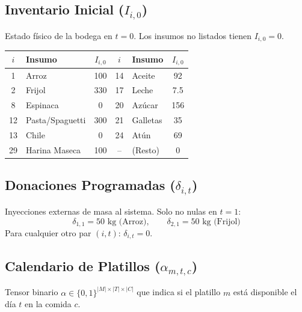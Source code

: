 \documentclass[12pt, letterpaper]{article}
\begin{document}
\subsection{Inventario Inicial ($I_{i,0}$)}

Estado físico de la bodega en $t = 0$. Los insumos no listados tienen $I_{i,0} = 0$.

\begin{table}[h!]
\centering
\begin{tabular}{clc|clc}
\toprule
$i$ & \textbf{Insumo} & $I_{i,0}$ & $i$ & \textbf{Insumo} & $I_{i,0}$ \\
\midrule
1  & Arroz            & 100  & 14 & Aceite   & 92   \\
2  & Frijol           & 330  & 17 & Leche    & 7.5  \\
8  & Espinaca         & 0    & 20 & Azúcar   & 156  \\
12 & Pasta/Spaguetti  & 300  & 21 & Galletas & 35   \\
13 & Chile            & 0    & 24 & Atún     & 69   \\
29 & Harina Maseca    & 100  & -- & (Resto)  & 0    \\
\bottomrule
\end{tabular}
\end{table}

\subsection{Donaciones Programadas ($\delta_{i,t}$)}

Inyecciones externas de masa al sistema. Solo no nulas en $t = 1$:
\[
  \delta_{1,1} = 50 \text{ kg (Arroz)}, \qquad \delta_{2,1} = 50 \text{ kg (Frijol)}
\]
Para cualquier otro par $(i,t)$: $\delta_{i,t} = 0$.

\subsection{Calendario de Platillos ($\alpha_{m,t,c}$)}

Tensor binario $\alpha \in \{0,1\}^{|M| \times |T| \times |C|}$ que indica si el platillo $m$ está disponible el día $t$ en la comida $c$.
\end{document}
